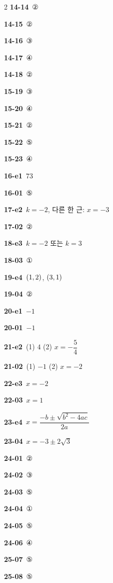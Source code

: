 \documentclass[10pt,a4paper]{article}
\begin{document}
\begin{multicols}{2}
\noindent\textbf{14-14}\ ②\par
\noindent\textbf{14-15}\ ②\par
\noindent\textbf{14-16}\ ③\par
\noindent\textbf{14-17}\ ④\par
\noindent\textbf{14-18}\ ②\par
\noindent\textbf{15-19}\ ③\par
\noindent\textbf{15-20}\ ④\par
\noindent\textbf{15-21}\ ②\par
\noindent\textbf{15-22}\ ⑤\par
\noindent\textbf{15-23}\ ④\par
\noindent\textbf{16-e1}\ $73$\par
\noindent\textbf{16-01}\ ⑤\par
\noindent\textbf{17-e2}\ $k=-2$, 다른 한 근: $x=-3$\par
\noindent\textbf{17-02}\ ②\par
\noindent\textbf{18-e3}\ $k=-2$ 또는 $k=3$\par
\noindent\textbf{18-03}\ ①\par
\noindent\textbf{19-e4}\ $(1{,}\mkern3mu 2)$, $(3{,}\mkern3mu 1)$\par
\noindent\textbf{19-04}\ ②\par
\noindent\textbf{20-e1}\ $-1$\par
\noindent\textbf{20-01}\ $-1$\par
\noindent\textbf{21-e2}\ (1) $4$ (2) $x=-\dfrac{5}{4}$\par
\noindent\textbf{21-02}\ (1) $-1$ (2) $x=-2$\par
\noindent\textbf{22-e3}\ $x=-2$\par
\noindent\textbf{22-03}\ $x=1$\par
\noindent\textbf{23-e4}\ $x=\dfrac{-b\pm\sqrt{b^2-4ac}}{2a}$\par
\noindent\textbf{23-04}\ $x=-3\pm2\sqrt{3}$\par
\noindent\textbf{24-01}\ ②\par
\noindent\textbf{24-02}\ ③\par
\noindent\textbf{24-03}\ ⑤\par
\noindent\textbf{24-04}\ ①\par
\noindent\textbf{24-05}\ ⑤\par
\noindent\textbf{24-06}\ ④\par
\noindent\textbf{25-07}\ ⑤\par
\noindent\textbf{25-08}\ ⑤\par

\end{multicols}
\end{document}
